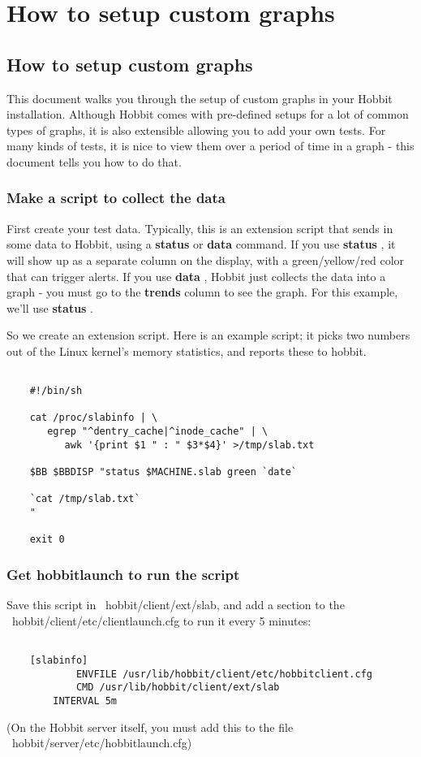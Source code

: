 \chapter{How to setup custom graphs}
\section{How to setup custom graphs}

 This document walks you through the setup of custom graphs in your Hobbit installation. Although Hobbit comes with pre-defined setups for a lot of common types of graphs, it is also extensible allowing you to add your own tests. For many kinds of tests, it is nice to view them over a period of time in a graph - this document tells you how to do that. \subsection{Make a script to collect the data}


 First create your test data. Typically, this is an extension script that sends in some data to Hobbit, using a \textbf{status}
 or \textbf{data}
 command. If you use \textbf{status}
, it will show up as a separate column on the display, with a green/yellow/red color that can trigger alerts. If you use \textbf{data}
, Hobbit just collects the data into a graph - you must go to the \textbf{trends}
 column to see the graph. For this example, we'll use \textbf{status}
.


 So we create an extension script. Here is an example script; it picks two numbers out of the Linux kernel's memory statistics, and reports these to hobbit. \begin{verbatim}

	#!/bin/sh

	cat /proc/slabinfo | \
	   egrep "^dentry_cache|^inode_cache" | \
	      awk '{print $1 " : " $3*$4}' >/tmp/slab.txt

	$BB $BBDISP "status $MACHINE.slab green `date`

	`cat /tmp/slab.txt`
	"

	exit 0

\end{verbatim}

\subsection{Get hobbitlaunch to run the script}


 Save this script in ~hobbit/client/ext/slab, and add a section to the ~hobbit/client/etc/clientlaunch.cfg to run it every 5 minutes: \begin{verbatim}

	[slabinfo]
        	ENVFILE /usr/lib/hobbit/client/etc/hobbitclient.cfg
	        CMD /usr/lib/hobbit/client/ext/slab
		INTERVAL 5m

\end{verbatim}
 (On the Hobbit server itself, you must add this to the file ~hobbit/server/etc/hobbitlaunch.cfg) 
